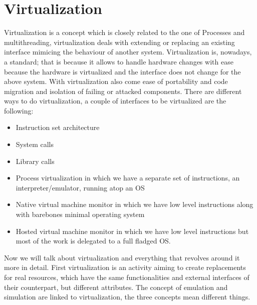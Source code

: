 \chapter{Virtualization}
Virtualization is a concept which is closely related to the one of Processes and multithreading, virtualization deals with extending or replacing an existing interface mimicing the behaviour of another system. \n
Virtualization is, nowadays, a standard; that is because it allows to handle hardware changes with ease because the hardware is virtualized and the interface does not change for the above system. With virtualization also come ease of portability and code migration and isolation of failing or attacked components. \n
There are different ways to do virtualization, a couple of interfaces to be virtualized are the following:
\begin{itemize}
    \item Instruction set architecture
    \item System calls
    \item Library calls
    \item Process virtualization in which we have a separate set of instructions, an interpreter/emulator, running atop an OS
    \item Native virtual machine monitor in which we have low level instructions along with barebones minimal operating system
    \item Hosted virtual machine monitor in which we have low level instructions but most of the work is delegated to a full fladged OS.
\end{itemize}
Now we will talk about virtualization and everything that revolves around it more in detail. \n
First virtualization is an activity aiming to create replacements for real resources, which have the same functionalities and external interfaces of their counterpart, but different attributes. \n
The concept of emulation and simulation are linked to virtualization, the three concepts mean different things. \n
